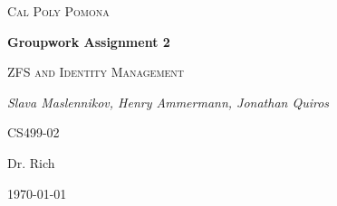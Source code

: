 \documentclass[letterpaper,12pt,titlepage]{article}
\date{Monday, March 7th 2016}
\author{Slava Maslennikov \and Henry Ammermann \and Jonathan Quiros}
\begin{document}

\begin{titlepage}
\centering
{\scshape\LARGE Cal Poly Pomona\par}
\vspace{1cm}
{\bfseries Groupwork Assignment 2\par}
\vspace{1.5cm}
{\scshape\Large ZFS and Identity Management\par}
\vspace{2cm}
{\Large\itshape Slava Maslennikov, Henry Ammermann, Jonathan Quiros\par}
\vfill
CS499-02\par
Dr. Rich
\vfill
{\large \today\par}
\end{titlepage}

\tableofcontents








\end{document}
